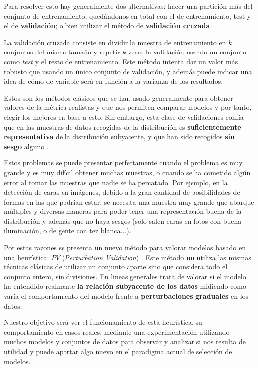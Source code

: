 Para resolver esto hay generalmente dos alternativas: hacer una partición más del conjunto de entrenamiento, quedándonos en total con el de entrenamiento, test y el de \textbf{validación}; o bien utilizar el método de \textbf{validación cruzada}.

La validación cruzada consiste en dividir la muestra de entrenamiento en $k$ conjuntos del mismo tamaño y repetir $k$ veces la validación usando un conjunto como \emph{test} y el resto de entrenamiento. Este método intenta dar un valor más robusto que usando un único conjunto de validación, y además puede indicar una idea de cómo de variable será en función a la varianza de los resultados.

Estos son los métodos clásicos que se han usado generalmente para obtener valores de la métrica realistas y que nos permiten comparar modelos y por tanto, elegir los mejores en base a esto. Sin embargo, esta clase de validaciones confía que en las muestras de datos recogidas de la distribución es \textbf{suficientemente representativa} de la distribución subyacente, y que han sido recogidos \textbf{sin sesgo} alguno \cite{zhang2019perturbation}.

Estos problemas se puede presentar perfectamente cuando el problema es muy grande y es muy difícil obtener muchas muestras, o cuando se ha cometido algún error al tomar las muestras que nadie se ha percatado. Por ejemplo, en la detección de caras en imágenes, debido a la gran cantidad de posibilidades de formas en las que podrían estar, se necesita una muestra muy grande que abarque múltiples y diversas maneras para poder tener una representación buena de la distribución y además que no haya sesgos (solo salen caras en fotos con buena iluminación, o de gente con tez blanca...).

Por estas razones se presenta un nuevo método para valorar modelos basado en una heurística: $PV$ (\emph{Perturbation Validation}) \cite{zhang2019perturbation}. Este método \textbf{no} utiliza las mismas técnicas clásicas de utilizar un conjunto aparte sino que considera todo el conjunto entero, sin divisiones. En lineas generales trata de valorar si el modelo ha entendido realmente \textbf{la relación subyacente de los datos} midiendo como varía el comportamiento del modelo frente a \textbf{perturbaciones graduales} en los datos.

Nuestro objetivo será ver el funcionamiento de esta heurística, su comportamiento en casos reales, mediante una experimentación utilizando muchos modelos y conjuntos de datos para observar y analizar si nos resulta de utilidad y puede aportar algo nuevo en el paradigma actual de selección de modelos.

